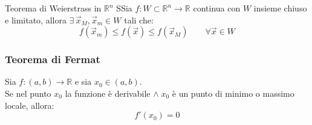 \documentclass{article}  %
\begin{document}
\begin{theorem}{Teorema di Weierstrass in $\mathbb{R}^n$}
	SSia $f: W \subset \mathbb{R}^n \to \mathbb{R}$ continua con $W$ insieme chiuso e limitato, allora $\exists \, \vec{x}_M,\vec{x}_m \in W$ tali che:
	\[
		f(\vec{x}_m) \leq f(\vec{x}) \leq f(\vec{x}_M) \quad \quad \forall{\vec{x}} \in W
	\]
\end{theorem}

\subsubsection{Teorema di Fermat}
\begin{osservazioni}
	Sia $f:\left(a,b\right) \to \mathbb{R}$ e sia $x_0 \in \left(a,b\right)$. \\
	Se nel punto $x_0$ la funzione è derivabile $\land \; x_0$ è un punto di minimo o massimo locale, allora:
	\[
		f'(x_0)=0
	\]
\end{osservazioni}
\end{document}
